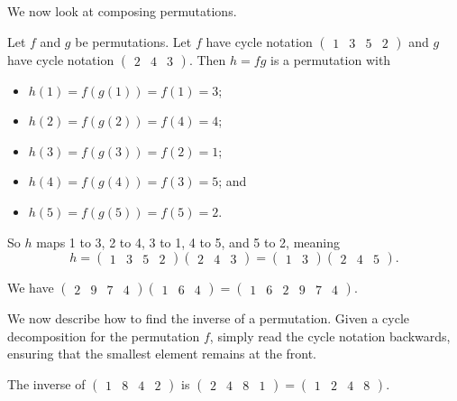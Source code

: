We now look at composing permutations.
\begin{example}
    Let $f$ and $g$ be permutations. Let $f$ have cycle notation $\begin{pmatrix}1 & 3 & 5 & 2\end{pmatrix}$ and $g$ have cycle notation $\begin{pmatrix}2 & 4 & 3\end{pmatrix}$. Then $h = fg$ is a permutation with
    \begin{itemize}
        \item $h(1) = f(g(1)) = f(1) = 3$;
        \item $h(2) = f(g(2)) = f(4) = 4$;
        \item $h(3) = f(g(3)) = f(2) = 1$;
        \item $h(4) = f(g(4)) = f(3) = 5$; and
        \item $h(5) = f(g(5)) = f(5) = 2$.
    \end{itemize}

    So $h$ maps 1 to 3, 2 to 4, 3 to 1, 4 to 5, and 5 to 2, meaning
    \[
        h = \begin{pmatrix}1 & 3 & 5 & 2\end{pmatrix}\begin{pmatrix}2 & 4 & 3\end{pmatrix} = \begin{pmatrix}1 & 3\end{pmatrix}\begin{pmatrix}2 & 4 & 5\end{pmatrix}.
    \]
\end{example}

\begin{example}
    We have $ \begin{pmatrix}2 & 9 & 7 & 4\end{pmatrix}\begin{pmatrix}1 & 6 & 4\end{pmatrix} = \begin{pmatrix}1 & 6 & 2 & 9 & 7 & 4\end{pmatrix}$.
\end{example}

We now describe how to find the inverse of a permutation. Given a cycle decomposition for the permutation $f$, simply read the cycle notation backwards, ensuring that the smallest element remains at the front.

\begin{example}
    The inverse of $\begin{pmatrix}1 & 8 & 4 & 2\end{pmatrix}$ is $\begin{pmatrix}2 & 4 & 8 & 1\end{pmatrix} = \begin{pmatrix}1 & 2 & 4 & 8\end{pmatrix}$.
\end{example}

